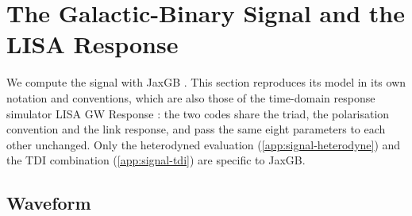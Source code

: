 \section{The Galactic-Binary Signal and the LISA Response}
\label{app:signal}

We compute the signal with JaxGB \citep{jaxgb}. This section reproduces its model in its own
notation and conventions, which are also those of the time-domain response simulator LISA GW
Response \citep{lisagwresponse}: the two codes share the triad, the polarisation convention
and the link response, and pass the same eight parameters to each other unchanged. Only
the heterodyned evaluation (\cref{app:signal-heterodyne}) and the TDI combination
(\cref{app:signal-tdi}) are specific to JaxGB.

\subsection{Waveform}
\label{app:signal-waveform}

